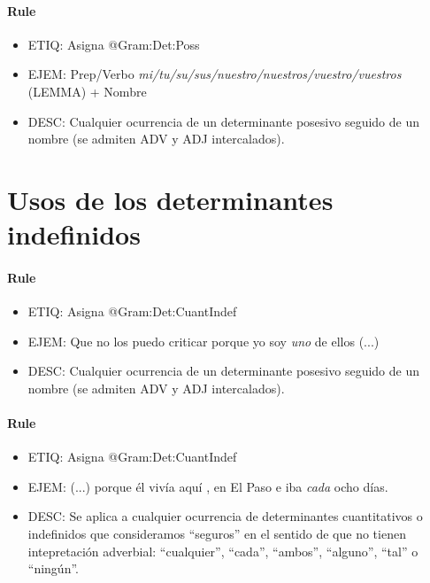 \documentclass[11pt]{report}
\begin{document}
\paragraph*{Rule}
\begin{itemize}
\item ETIQ: Asigna @Gram:Det:Poss
\item EJEM: Prep/Verbo \emph{mi/tu/su/sus/nuestro/nuestros/vuestro/vuestros} (LEMMA) + Nombre
\item DESC: Cualquier ocurrencia de un determinante posesivo seguido de un nombre (se admiten ADV y ADJ intercalados).
\end{itemize}

\section{Usos de los determinantes indefinidos}
\paragraph*{Rule}
\begin{itemize}
\item ETIQ: Asigna @Gram:Det:CuantIndef
\item EJEM: Que no los puedo criticar porque yo soy \emph{uno} de ellos (...)
\item DESC: Cualquier ocurrencia de un determinante posesivo seguido de un nombre (se admiten ADV y ADJ intercalados).
\end{itemize}

\paragraph*{Rule}
\begin{itemize}
\item ETIQ: Asigna @Gram:Det:CuantIndef
\item EJEM: (...) porque él vivía aquí , en El Paso e iba \emph{cada} ocho días.
\item DESC: Se aplica a cualquier ocurrencia de determinantes cuantitativos o indefinidos que consideramos ``seguros'' en el sentido de que no tienen intepretación adverbial: ``cualquier'', ``cada'', ``ambos'', ``alguno'', ``tal'' o ``ningún''.
\end{itemize}
\end{document}
